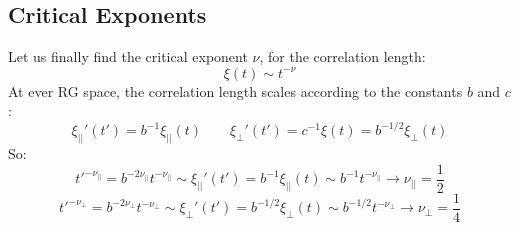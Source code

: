\documentclass{article}
\begin{document}
\subsection{Critical Exponents}
Let us finally find the critical exponent $\nu$, for the correlation length:
\begin{equation}
    \xi(t) \sim t^{-\nu}
\end{equation}
At ever RG space, the correlation length scales according to the constants $b$ and $c$:
\begin{equation}
    \xi_{||}'(t') = b^{-1}\xi_{||}(t)
    \qquad
    \xi_{\perp}'(t') = c^{-1}\xi(t) = b^{-1/2}\xi_{\perp}(t)
\end{equation}
So:
\begin{equation}
    t'^{-\nu_{||}} = b^{-2\nu_{||}}t^{-\nu_{||}} \sim \xi_{||}'(t') = b^{-1}\xi_{||}(t) \sim b^{-1}t^{-\nu_{||}} \rightarrow \nu_{||} = \frac{1}{2}
\end{equation}
\begin{equation}
    t'^{-\nu_{\perp}} = b^{-2\nu_{\perp}}t^{-\nu_{\perp}} \sim \xi_{\perp}'(t') = b^{-1/2}\xi_{\perp}(t) \sim b^{-1/2}t^{-\nu_{\perp}} \rightarrow \nu_{\perp} = \frac{1}{4}
\end{equation}
\end{document}
